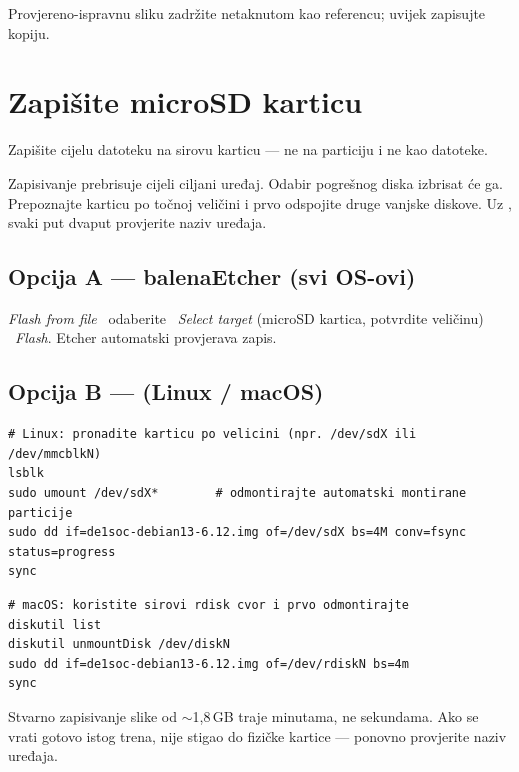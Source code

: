 \begin{tip}
Provjereno-ispravnu sliku zadržite netaknutom kao referencu; uvijek zapisujte kopiju.
\end{tip}

\section{Zapišite microSD karticu}
Zapišite cijelu  datoteku na sirovu karticu --- ne na particiju i ne kao datoteke.
\begin{warn}
Zapisivanje prebrisuje cijeli ciljani uređaj. Odabir pogrešnog diska izbrisat će
ga. Prepoznajte karticu po točnoj veličini i prvo odspojite druge vanjske diskove.
Uz , svaki put dvaput provjerite naziv uređaja.
\end{warn}

\subsection{Opcija A --- balenaEtcher (svi OS-ovi)}
\emph{Flash from file} \arr\ odaberite  \arr\ \emph{Select target}
(microSD kartica, potvrdite veličinu) \arr\ \emph{Flash}. Etcher automatski provjerava zapis.

\subsection{Opcija B ---  (Linux / macOS)}
\begin{lstlisting}
# Linux: pronadite karticu po velicini (npr. /dev/sdX ili /dev/mmcblkN)
lsblk
sudo umount /dev/sdX*        # odmontirajte automatski montirane particije
sudo dd if=de1soc-debian13-6.12.img of=/dev/sdX bs=4M conv=fsync status=progress
sync
\end{lstlisting}
\begin{lstlisting}
# macOS: koristite sirovi rdisk cvor i prvo odmontirajte
diskutil list
diskutil unmountDisk /dev/diskN
sudo dd if=de1soc-debian13-6.12.img of=/dev/rdiskN bs=4m
sync
\end{lstlisting}
\begin{tip}
Stvarno zapisivanje slike od $\sim$1,8\,GB traje minutama, ne sekundama. Ako se
 vrati gotovo istog trena, nije stigao do fizičke kartice --- ponovno
provjerite naziv uređaja.
\end{tip}

